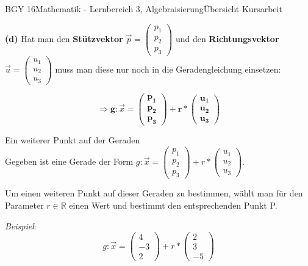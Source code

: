 \documentclass[oneside,openany,headings=optiontotoc,11pt,numbers=noenddot]{scrreprt}
\begin{document}
\begin{worksheet}{BGY 16}{Mathematik - Lernbereich 3, Algebraisierung}{Übersicht Kursarbeit}
\begin{framed}
			\par\bigskip\noindent
			\textbf{(d)} Hat man den \textbf{Stützvektor} \(\vec{p} = \left(\begin{array}{c}p_1\\p_2\\p_3\end{array}\right)\) und den \textbf{Richtungsvektor} \(\vec{u} = \left(\begin{array}{c}u_1\\u_2\\u_3\end{array}\right)\) muss man diese nur noch in die Geradengleichung einsetzen:\\
			\par\noindent
			\[\Rightarrow \mathbf{g:} \vec{x} \mathbf{= \left(\begin{array}{c}p_1\\p_2\\p_3\end{array}\right) + r*\left(\begin{array}{c}u_1\\u_2\\u_3\end{array}\right)}\]
		\end{framed}
		\begin{framed}
			\noindent
			\tiny{\color{codegray}Ein weiterer Punkt auf der Geraden}\normalcolor\normalsize\\
			Gegeben ist eine Gerade der Form \(g: \vec{x} = \left(\begin{array}{c}p_1\\p_2\\p_3\end{array}\right) + r*\left(\begin{array}{c}u_1\\u_2\\u_3\end{array}\right)\).\\
			\par\bigskip\noindent
			Um einen weiteren Punkt auf dieser Geraden zu bestimmen, wählt man für den Parameter \(r \in \mathbb{R}\) einen Wert und bestimmt den entsprechenden Punkt P.\\
			\par\bigskip\noindent
			\textit{Beispiel}: \[g: \vec{x} = \left(\begin{array}{c}4\\-3\\2\end{array}\right) + r*\left(\begin{array}{c}2\\3\\-5\end{array}\right)\]

\end{framed}
\end{worksheet}
\end{document}
